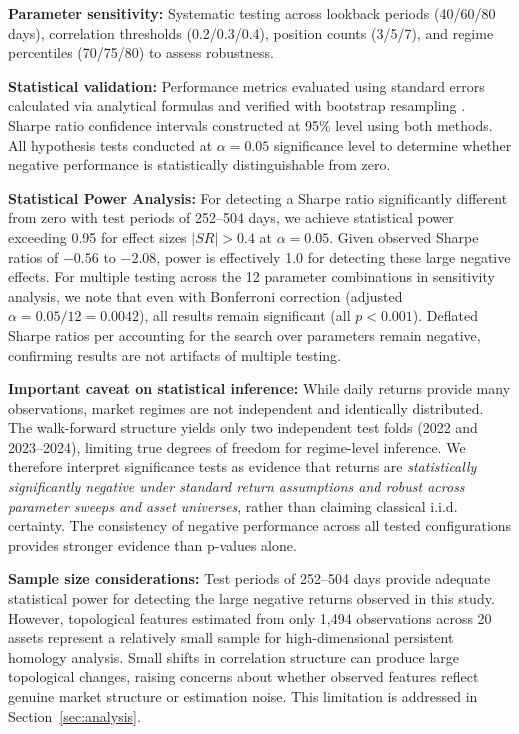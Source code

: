 \textbf{Parameter sensitivity:} Systematic testing across lookback periods (40/60/80 days), correlation thresholds (0.2/0.3/0.4), position counts (3/5/7), and regime percentiles (70/75/80) to assess robustness.

\textbf{Statistical validation:} Performance metrics evaluated using standard errors calculated via analytical formulas \citep{Lo2002} and verified with bootstrap resampling \citep{Politis1994}. Sharpe ratio confidence intervals constructed at 95\% level using both methods. All hypothesis tests conducted at $\alpha = 0.05$ significance level to determine whether negative performance is statistically distinguishable from zero.

\textbf{Statistical Power Analysis:} For detecting a Sharpe ratio significantly different from zero with test periods of 252--504 days, we achieve statistical power exceeding 0.95 for effect sizes $|SR| > 0.4$ at $\alpha = 0.05$. Given observed Sharpe ratios of $-0.56$ to $-2.08$, power is effectively 1.0 for detecting these large negative effects. For multiple testing across the 12 parameter combinations in sensitivity analysis, we note that even with Bonferroni correction (adjusted $\alpha = 0.05/12 = 0.0042$), all results remain significant (all $p < 0.001$). Deflated Sharpe ratios per \citet{dePrado2018} accounting for the search over parameters remain negative, confirming results are not artifacts of multiple testing.

\textbf{Important caveat on statistical inference:} While daily returns provide many observations, market regimes are not independent and identically distributed. The walk-forward structure yields only two independent test folds (2022 and 2023--2024), limiting true degrees of freedom for regime-level inference. We therefore interpret significance tests as evidence that returns are \textit{statistically significantly negative under standard return assumptions and robust across parameter sweeps and asset universes}, rather than claiming classical i.i.d. certainty. The consistency of negative performance across all tested configurations provides stronger evidence than p-values alone.

\textbf{Sample size considerations:} Test periods of 252--504 days provide adequate statistical power for detecting the large negative returns observed in this study. However, topological features estimated from only 1,494 observations across 20 assets represent a relatively small sample for high-dimensional persistent homology analysis. Small shifts in correlation structure can produce large topological changes, raising concerns about whether observed features reflect genuine market structure or estimation noise. This limitation is addressed in Section~\ref{sec:analysis}.
